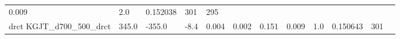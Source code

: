 \documentclass[11pt]{article}
\begin{document}
\begin{longtable}[]{@{}llllllllllll@{}}
\begin{minipage}[t]{0.04\columnwidth}
0.009\strut
\end{minipage} & \begin{minipage}[t]{0.05\columnwidth}\raggedright\strut
2.0\strut
\end{minipage} & \begin{minipage}[t]{0.05\columnwidth}\raggedright\strut
0.152038\strut
\end{minipage} & \begin{minipage}[t]{0.05\columnwidth}\raggedright\strut
301\strut
\end{minipage} & \begin{minipage}[t]{0.07\columnwidth}\raggedright\strut
295\strut
\end{minipage}\tabularnewline
\begin{minipage}[t]{0.18\columnwidth}\raggedright\strut
drct KGJT\_d700\_500\_drct\strut
\end{minipage} & \begin{minipage}[t]{0.04\columnwidth}\raggedright\strut
345.0\strut
\end{minipage} & \begin{minipage}[t]{0.04\columnwidth}\raggedright\strut
-355.0\strut
\end{minipage} & \begin{minipage}[t]{0.04\columnwidth}\raggedright\strut
-8.4\strut
\end{minipage} & \begin{minipage}[t]{0.04\columnwidth}\raggedright\strut
0.004\strut
\end{minipage} & \begin{minipage}[t]{0.05\columnwidth}\raggedright\strut
0.002\strut
\end{minipage} & \begin{minipage}[t]{0.04\columnwidth}\raggedright\strut
0.151\strut
\end{minipage} & \begin{minipage}[t]{0.04\columnwidth}\raggedright\strut
0.009\strut
\end{minipage} & \begin{minipage}[t]{0.05\columnwidth}\raggedright\strut
1.0\strut
\end{minipage} & \begin{minipage}[t]{0.05\columnwidth}\raggedright\strut
0.150643\strut
\end{minipage} & \begin{minipage}[t]{0.05\columnwidth}\raggedright\strut
301\strut
\end{minipage} & \begin{minipage}[t]{0.07\columnwidth}\raggedright\strut

\end{minipage}
\end{longtable}
\end{document}
